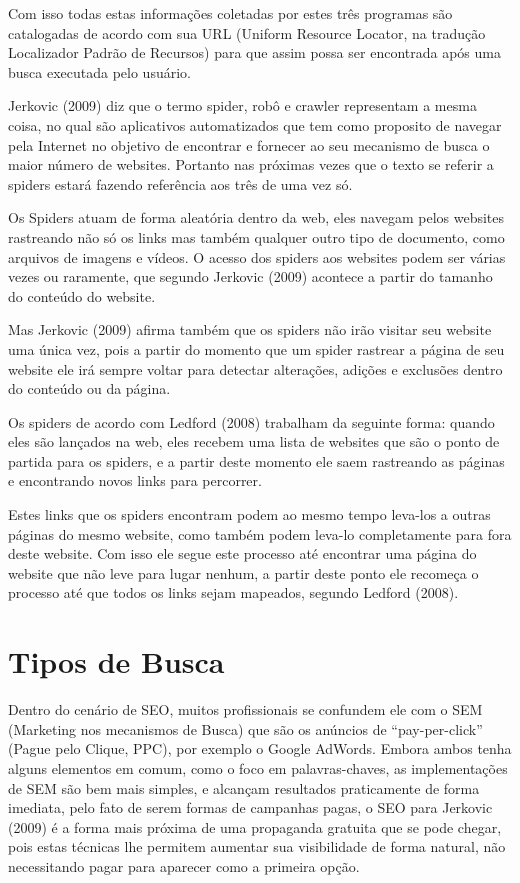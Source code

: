 \documentclass[
	12pt,				%
	openright,			%
	twoside,			%
	a4paper,			%
	english,			%
	french,				%
	spanish,			%
	brazil				%
	]{abntex2}
\begin{document}
Com isso todas estas informações coletadas por estes três programas são catalogadas de acordo com sua URL (Uniform Resource Locator, na tradução Localizador Padrão de Recursos) para que assim possa ser encontrada após uma busca executada pelo usuário.

Jerkovic (2009) diz que o termo spider, robô e crawler representam a mesma coisa, no qual são aplicativos automatizados que tem como proposito de navegar pela Internet no objetivo de encontrar e fornecer ao seu mecanismo de busca o maior número de websites. Portanto nas próximas vezes que o texto se referir a spiders estará fazendo referência aos três de uma vez só.

Os Spiders atuam de forma aleatória dentro da web, eles navegam pelos websites rastreando não só os links mas também qualquer outro tipo de documento, como arquivos de imagens e vídeos. O acesso dos spiders aos websites podem ser várias vezes ou raramente, que segundo Jerkovic (2009) acontece a partir do tamanho do conteúdo do website.
 
Mas Jerkovic (2009) afirma também que os spiders não irão visitar seu website uma única vez, pois a partir do momento que um spider rastrear a página de seu website ele irá sempre voltar para detectar alterações, adições e exclusões dentro do conteúdo ou da página.

Os spiders de acordo com Ledford (2008) trabalham da seguinte forma: quando eles são lançados na web, eles recebem uma lista de websites que são o ponto de partida para os spiders, e a partir deste momento ele saem rastreando as páginas e encontrando novos links para percorrer.

Estes links que os spiders encontram podem ao mesmo tempo leva-los a outras páginas do mesmo website, como também podem leva-lo completamente para fora deste website. Com isso ele segue este processo até encontrar uma página do website que não leve para lugar nenhum, a partir deste ponto ele recomeça o processo até que todos os links sejam mapeados, segundo Ledford (2008). 

\chapter{Tipos de Busca}

Dentro do cenário de SEO, muitos profissionais se confundem ele com o SEM (Marketing nos mecanismos de Busca) que são os anúncios de “pay-per-click” (Pague pelo Clique, PPC), por exemplo o Google AdWords. Embora ambos tenha alguns elementos em comum, como o foco em palavras-chaves, as implementações de SEM são bem mais simples, e alcançam resultados praticamente de forma imediata, pelo fato de serem formas de campanhas pagas, o SEO para Jerkovic (2009) é a forma mais próxima de uma propaganda gratuita que se pode chegar, pois estas técnicas lhe permitem aumentar sua visibilidade de forma natural, não necessitando pagar para aparecer como a primeira opção.
\end{document}
